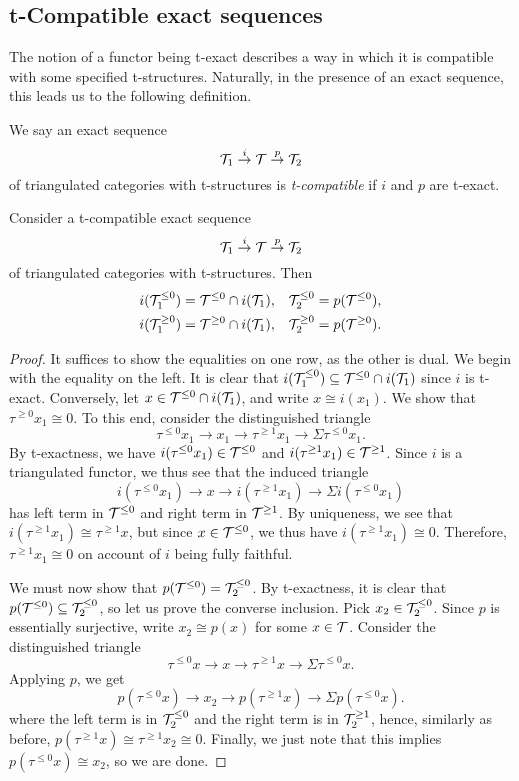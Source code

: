 \subsection{t-Compatible exact sequences}
The notion of a functor being t-exact describes a way in which it is compatible with some specified t-structures. Naturally, in the presence of an exact sequence, this leads us to the following definition.
\begin{definition}
	We say an exact sequence
	\[ \mathcal{T}_1 \overset{i}\to \mathcal{T} \overset{p}\to \mathcal{T}_2 \]
	of triangulated categories with t-structures is \emph{t-compatible} if \(i\) and \(p\) are t-exact.
\end{definition}
\begin{proposition}
	Consider a t-compatible exact sequence
	\[ \mathcal{T}_1 \overset{i}\to \mathcal{T} \overset{p}\to \mathcal{T}_2 \]
	of triangulated categories with t-structures. Then
	\begin{align*}
		i(\mathcal{T}_1^{\leq 0}) &= \mathcal{T}^{\leq 0}\cap i(\mathcal{T}_1), & \mathcal{T}_2^{\leq 0} &= p(\mathcal{T}^{\leq 0}), \\
		i(\mathcal{T}_1^{\geq 0}) &= \mathcal{T}^{\geq 0}\cap i(\mathcal{T}_1), & \mathcal{T}_2^{\geq 0} &= p(\mathcal{T}^{\geq 0}).
	\end{align*}
\end{proposition}
\begin{proof}
It suffices to show the equalities on one row, as the other is dual. We begin with the equality on the left. It is clear that \(i(\mathcal{T}_1^{\leq 0}) \subseteq \mathcal{T}^{\leq 0}\cap i(\mathcal{T}_1)\)
since \(i\) is t-exact. Conversely, let \(x\in\mathcal{T}^{\leq 0}\cap i(\mathcal{T}_1)\), and write \(x \cong i(x_1)\). We show that \(\tau^{\geq 0}x_1 \cong 0\). To this end, consider the distinguished triangle
\[ \tau^{\leq 0}x_1 \to x_1 \to \tau^{\geq 1}x_1 \to \Sigma \tau^{\leq 0}x_1. \]
By t-exactness, we have \(i(\tau^{\leq 0}x_1) \in \mathcal{T}^{\leq 0}\) and \(i(\tau^{\geq 1}x_1) \in \mathcal{T}^{\geq 1}\). Since \(i\) is a triangulated functor, we thus see that the induced triangle
\[ i(\tau^{\leq 0}x_1) \to x \to i(\tau^{\geq 1}x_1) \to \Sigma i(\tau^{\leq 0}x_1) \]
has left term in \(\mathcal{T}^{\leq 0}\) and right term in \(\mathcal{T}^{\geq 1}\). By uniqueness, we see that \(i(\tau^{\geq 1}x_1) \cong \tau^{\geq 1}x\), but since \(x\in\mathcal{T}^{\leq 0}\), we thus
have \(i(\tau^{\geq 1}x_1)\cong 0\). Therefore, \(\tau^{\geq 1}x_1 \cong 0\) on account of \(i\) being fully faithful.

We must now show that \(p(\mathcal{T}^{\leq 0}) = \mathcal{T}_2^{\leq 0}\). By t-exactness, it is clear that \(p(\mathcal{T}^{\leq 0}) \subseteq \mathcal{T}_2^{\leq 0}\), so let us prove the converse inclusion.
Pick \(x_2 \in \mathcal{T}_2^{\leq 0}\). Since \(p\) is essentially surjective, write \(x_2 \cong p(x)\) for some \(x\in\mathcal{T}\). Consider the distinguished triangle
\[ \tau^{\leq 0}x \to x \to \tau^{\geq 1}x \to \Sigma\tau^{\leq 0}x. \]
Applying \(p\), we get
\[ p(\tau^{\leq 0}x) \to x_2 \to p(\tau^{\geq 1}x) \to \Sigma p(\tau^{\leq 0}x). \]
where the left term is in \(\mathcal{T}_2^{\leq 0}\) and the right term is in \(\mathcal{T}_2^{\geq 1}\), hence, similarly as before, \(p(\tau^{\geq 1}x) \cong \tau^{\geq 1}x_2 \cong 0\).
Finally, we just note that this implies \(p(\tau^{\leq 0}x) \cong x_2\), so we are done.
\end{proof}
